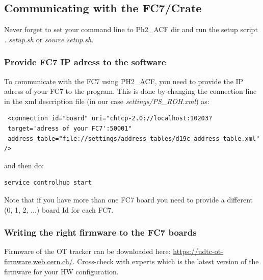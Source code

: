 \documentclass[10pt,a4paper]{article}
\begin{document}
\subsection{Communicating with the FC7/Crate}

Never forget to set your command line to Ph2\_ACF dir and run the setup script \emph{. setup.sh} or \emph{source setup.sh}.

\subsubsection{Provide FC7 IP adress to the software}
To communicate with the FC7 using PH2\_ACF, you need to provide the IP adress of your FC7 to the program. This is done by changing the connection line in the xml description file (in our case \emph{settings/PS\_ROH.xml}) as:

\begin{framed}
\begin{verbatim}
 <connection id="board" uri="chtcp-2.0://localhost:10203?
 target='adress of your FC7':50001" 
 address_table="file://settings/address_tables/d19c_address_table.xml" />
\end{verbatim}
\end{framed}

and then do:
\begin{framed}
\begin{verbatim}
service controlhub start
\end{verbatim}
\end{framed}

Note that if you have more than one FC7 board you need to provide a different (0, 1, 2, ...) board Id for each FC7.

\subsubsection{Writing the right firmware to the FC7 boards}
Firmware of the OT tracker can be downloaded here: \url{https://udtc-ot-firmware.web.cern.ch/}.
Cross-check with experts which is the latest version of the firmware for your HW configuration.
\end{document}
